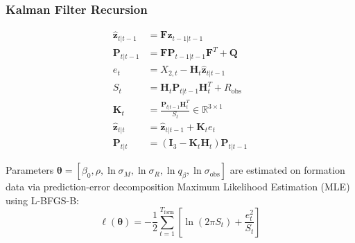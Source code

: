\documentclass[11pt, a4paper]{article}
\begin{document}
\subsubsection{Kalman Filter Recursion}
\begin{align}
    \hat{\mathbf{z}}_{t|t-1} &= \mathbf{F} \hat{\mathbf{z}}_{t-1|t-1} \\
    \mathbf{P}_{t|t-1} &= \mathbf{F} \mathbf{P}_{t-1|t-1} \mathbf{F}^T + \mathbf{Q} \\
    e_t &= X_{2,t} - \mathbf{H}_t \hat{\mathbf{z}}_{t|t-1} \\
    S_t &= \mathbf{H}_t \mathbf{P}_{t|t-1} \mathbf{H}_t^T + R_{\text{obs}} \\
    \mathbf{K}_t &= \frac{\mathbf{P}_{t|t-1} \mathbf{H}_t^T}{S_t} \in \mathbb{R}^{3 \times 1} \\
    \hat{\mathbf{z}}_{t|t} &= \hat{\mathbf{z}}_{t|t-1} + \mathbf{K}_t e_t \\
    \mathbf{P}_{t|t} &= (\mathbf{I}_3 - \mathbf{K}_t \mathbf{H}_t) \mathbf{P}_{t|t-1}
\end{align}

Parameters $\bm{\theta} = [\beta_0, \rho, \ln\sigma_M, \ln\sigma_R, \ln q_\beta, \ln\sigma_{\text{obs}}]$ are estimated on formation data via prediction-error decomposition Maximum Likelihood Estimation (MLE) using L-BFGS-B:
\begin{equation}
    \ell(\bm{\theta}) = -\frac{1}{2} \sum_{t=1}^{T_{\text{form}}} \left[ \ln(2\pi S_t) + \frac{e_t^2}{S_t} \right]
\end{equation}
\end{document}

